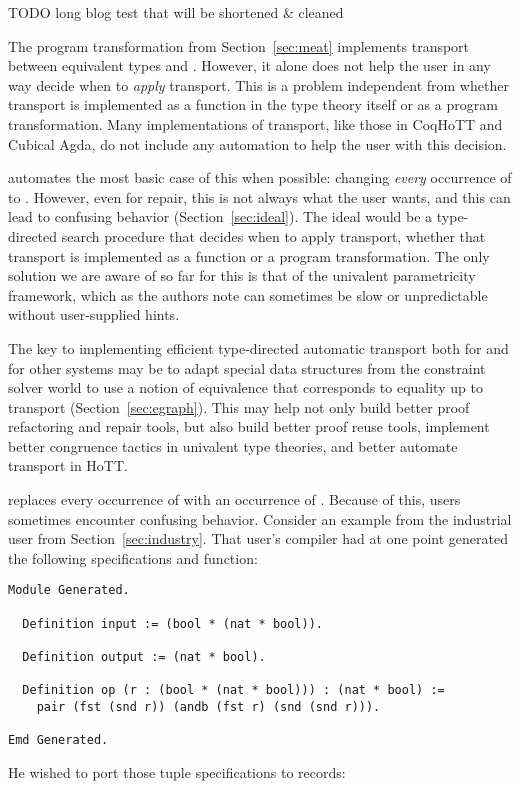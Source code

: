 TODO long blog test that will be shortened \& cleaned

The program transformation from Section~\ref{sec:meat} implements transport between equivalent types \A and \B.
However, it alone does not help the user in any way decide when to \textit{apply} transport.
This is a problem independent from whether transport is implemented as a function in the type theory itself
or as a program transformation.
Many implementations of transport, like those in CoqHoTT and Cubical Agda, %
do not include any automation to help the user with this decision.

\toolname automates the most basic case of this when possible: changing \textit{every} occurrence of \A to \B.
However, even for repair, this is not always what the user wants, and this can lead to confusing behavior (Section~\ref{sec:ideal}).
The ideal would be a type-directed search procedure that decides when to apply transport,
whether that transport is implemented as a function or a program transformation.
The only solution we are aware of so far for this is that of the univalent parametricity framework,
which as the authors note can sometimes be slow or unpredictable without user-supplied hints.

The key to implementing efficient type-directed automatic transport both for \toolname
and for other systems may be to adapt special data structures from the constraint solver world to use a
notion of equivalence that corresponds to equality up to transport (Section~\ref{sec:egraph}).
This may help not only build better proof refactoring and repair tools, but also build better proof reuse tools,
implement better congruence tactics in univalent type theories, and better automate transport in HoTT.

\toolname replaces every occurrence of \A with an occurrence of \B.
Because of this, users sometimes encounter confusing behavior.
Consider an example from the industrial user from Section~\ref{sec:industry}.
That user's compiler had at one point generated the following specifications and function:

\begin{lstlisting}
Module Generated.

  Definition input := (bool * (nat * bool)).

  Definition output := (nat * bool).

  Definition op (r : (bool * (nat * bool))) : (nat * bool) :=
    pair (fst (snd r)) (andb (fst r) (snd (snd r))).

Emd Generated.
\end{lstlisting}
He wished to port those tuple specifications to records:

